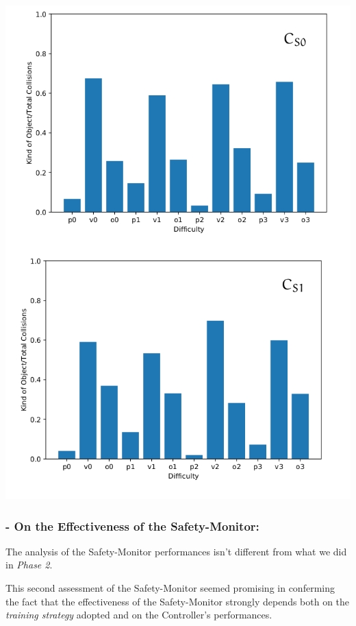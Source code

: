 \begin{minipage}[c]{\textwidth}
	\includegraphics[width=\textwidth]{img/hit-ratios-stupid-pro.png}
\end{minipage}

\subsubsection{- On the Effectiveness of the Safety-Monitor:}

The analysis of the Safety-Monitor performances isn't different from what we did in \textsl{Phase 2}.

This second assessment of the Safety-Monitor seemed promising in conferming the fact that the effectiveness of the Safety-Monitor strongly depends both on the \textsl{training strategy} adopted and on the Controller's performances.

